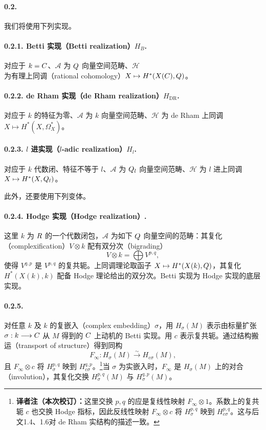 \paragraph*{0.2.} 我们将使用下列实现。

\paragraph*{0.2.1. Betti 实现（Betti realization）$H_B$.}
对应于 $k=C$、$\mathcal A$ 为 $Q$ 向量空间范畴、$\mathcal H$ 为有理上同调（rational cohomology）$X\mapsto H^*(X(C),Q)$。

\paragraph*{0.2.2. de Rham 实现（de Rham realization）$H_{\mathrm{DR}}$.}
对应于 $k$ 的特征为零、$\mathcal A$ 为 $k$ 向量空间范畴、$\mathcal H$ 为 de Rham 上同调 $X\mapsto H^*(X,\Omega_X^*)$。

\paragraph*{0.2.3. $l$ 进实现（$l$-adic realization）$H_l$.}
对应于 $k$ 代数闭、特征不等于 $l$、$\mathcal A$ 为 $Q_l$ 向量空间范畴、$\mathcal H$ 为 $l$ 进上同调 $X\mapsto H^*(X,Q_l)$。

此外，还要使用下列变体。

\paragraph*{0.2.4. Hodge 实现（Hodge realization）.}
这里 $k$ 为 $R$ 的一个代数闭包，$\mathcal A$ 为如下 $Q$ 向量空间的范畴：其复化（complexification）$V\otimes k$ 配有双分次（bigrading）
\[
 V\otimes k=\bigoplus V^{p,q},
\]
使得 $V^{q,p}$ 是 $V^{p,q}$ 的复共轭。上同调理论取函子 $X\mapsto H^*(X(k),Q)$，其复化 $H^*(X(k),k)$ 配备 Hodge 理论给出的双分次。Betti 实现为 Hodge 实现的底层实现。

\paragraph*{0.2.5.}
对任意 $k$ 及 $k$ 的复嵌入（complex embedding）$\sigma$，用 $H_\sigma(M)$ 表示由标量扩张 $\sigma:k\longrightarrow C$ 从 $M$ 得到的 $C$ 上动机的 Betti 实现。用 $c$ 表示复共轭。通过结构搬运（transport of structure）得到同构
\[
 F_\infty:H_\sigma(M)\xrightarrow{\sim}H_{c\sigma}(M),
\]
且 $F_\infty\otimes c$ 将 $H_\sigma^{p,q}$ 映到 $H_{c\sigma}^{q,p}$。\footnote{\textbf{译者注（本次校订）：}这里交换 $p,q$ 的应是复线性映射 $F_\infty\otimes1$。系数上的复共轭 $c$ 也交换 Hodge 指标，因此反线性映射 $F_\infty\otimes c$ 将 $H_\sigma^{p,q}$ 映到 $H_{c\sigma}^{p,q}$。这与后文1.4、1.6对 de Rham 实结构的描述一致。}当 $\sigma$ 为实嵌入时，$F_\infty$ 是 $H_\sigma(M)$ 上的对合（involution），其复化交换 $H_\sigma^{p,q}(M)$ 与 $H_\sigma^{q,p}(M)$。

